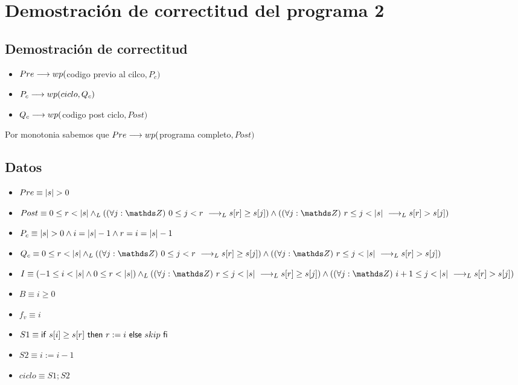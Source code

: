 \documentclass{article}
\begin{document}
\section*{Demostración de correctitud del programa 2}

\subsection*{Demostración de correctitud}

\begin{itemize}
    \item $Pre \longrightarrow wp($codigo previo al cilco$,P_{c})$
    \item $P_{c} \longrightarrow wp(ciclo, Q_{c})$
    \item $Q_{c} \longrightarrow wp($codigo post ciclo$,Post)$
\end{itemize}

Por monotonia sabemos que $Pre \longrightarrow wp($programa completo$, Post)$

\subsection*{Datos}

\begin{itemize}
    \item $Pre      \equiv |s| > 0$
    \item $Post     \equiv 0 \leq r < \longitud{s} \yLuego (\paraTodo{j}{0}{r} \implicaLuego s[r] \geq s[j]) \wedge (\paraTodo{j}{r}{\longitud{s}}\implicaLuego s[r] > s[j])$
    \item $P_{c}    \equiv |s| > 0 \wedge i = |s| - 1 \wedge r = i = |s| - 1$
    \item $Q_{c}    \equiv 0 \leq r < \longitud{s} \yLuego (\paraTodo{j}{0}{r} \implicaLuego s[r] \geq s[j]) \wedge (\paraTodo{j}{r}{\longitud{s}}\implicaLuego s[r] > s[j])$
    \item $I        \equiv (-1 \leq i < \longitud{s} \wedge 0 \leq r < \longitud{s}) \yLuego (\paraTodo{j}{r}{\longitud{s}} \implicaLuego s[r] \geq s[j]) \wedge (\paraTodo{j}{i+1}{\longitud{s}}\implicaLuego s[r] > s[j])$
    \item $B        \equiv i \geq 0$
    \item $f_{v}    \equiv i$
    \item $S1       \equiv \mathsf{if}\ s[i] \geq s[r]\ \mathsf{then}\ r:= i\ \mathsf{else}\ skip\ \mathsf{fi}$
    \item $S2       \equiv i:= i - 1$
    \item $ciclo    \equiv S1; S2$
\end{itemize}
\end{document}
